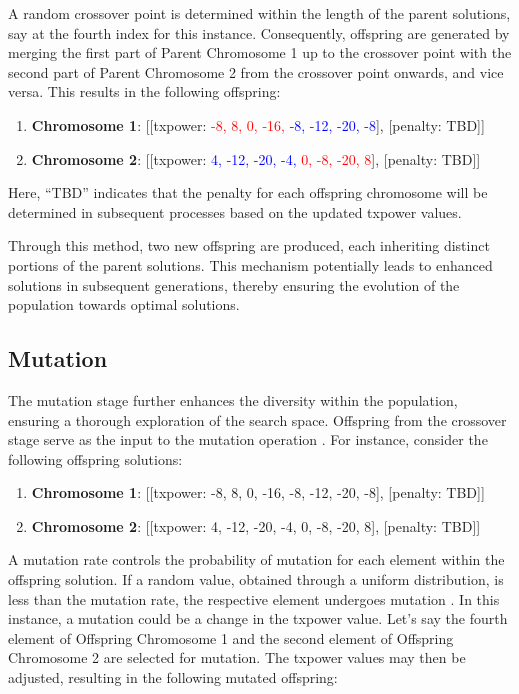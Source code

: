 A random crossover point is determined within the length of the parent solutions, say at the fourth index for this instance. Consequently, offspring are generated by merging the first part of Parent Chromosome 1 up to the crossover point with the second part of Parent Chromosome 2 from the crossover point onwards, and vice versa. This results in the following offspring:

\begin{enumerate}
    \item \textbf{Chromosome 1}: [[txpower: \textcolor{red}{-8, 8, 0, -16,} \textcolor{blue}{-8, -12, -20, -8}], [penalty: TBD]]
    \item \textbf{Chromosome 2}: [[txpower: \textcolor{blue}{4, -12, -20, -4,} \textcolor{red}{0, -8, -20, 8}], [penalty: TBD]]
\end{enumerate}

Here, ``TBD'' indicates that the penalty for each offspring chromosome will be determined in subsequent processes based on the updated txpower values.

Through this method, two new offspring are produced, each inheriting distinct portions of the parent solutions. This mechanism potentially leads to enhanced solutions in subsequent generations, thereby ensuring the evolution of the population towards optimal solutions.

\subsection{Mutation}

The mutation stage further enhances the diversity within the population, ensuring a thorough exploration of the search space. Offspring from the crossover stage serve as the input to the mutation operation \cite{lambora2019genetic}. For instance, consider the following offspring solutions:

\begin{enumerate}
    \item \textbf{Chromosome 1}: [[txpower: -8, 8, 0, -16, -8, -12, -20, -8], [penalty: TBD]]
    \item \textbf{Chromosome 2}: [[txpower: 4, -12, -20, -4, 0, -8, -20, 8], [penalty: TBD]]
\end{enumerate}

A mutation rate controls the probability of mutation for each element within the offspring solution. If a random value, obtained through a uniform distribution, is less than the mutation rate, the respective element undergoes mutation \cite{lambora2019genetic}. In this instance, a mutation could be a change in the txpower value. Let's say the fourth element of Offspring Chromosome 1 and the second element of Offspring Chromosome 2 are selected for mutation. The txpower values may then be adjusted, resulting in the following mutated offspring:


